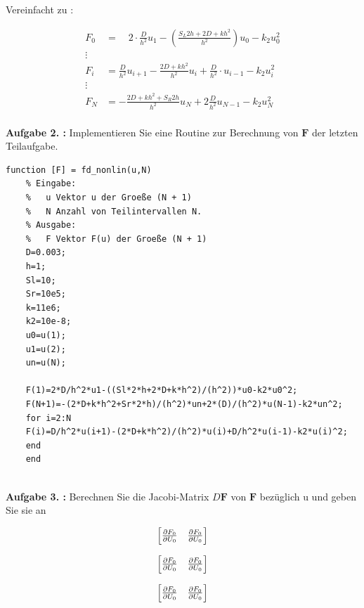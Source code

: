 \begin{qed}
	Vereinfacht zu :
	
	\begin{align*}
		F_0&= \quad 2\cdot \frac{D}{h^2}u_1-\left( \frac{S_L2h+2D+kh^2}{h^2}\right) u_0 -k_2u_0^2\\
		\vdots \\
		F_i&= 	\frac{D}{h^2}u_{i+1}-\frac{2D+kh^2}{h^2}u_i+\frac{D}{h^2}\cdot u_{i-1} -k_2u_i^2\\
		\vdots \\
		F_N &= -\frac{2D+kh^2+S_R2h}{h^2}u_N+2\frac{D}{h^2}u_{N-1}-k_2u^2_N\\
	\end{align*}
\end{qed}

\begin{mybox}
	\textbf{Aufgabe 2. :} Implementieren Sie eine Routine zur Berechnung von $\mathbf{F}$ der letzten Teilaufgabe.\cite{Prof.Dr.AndreasZeiser.April2021}
\end{mybox}

\begin{lstlisting}[style=Matlab-editor]
	function [F] = fd_nonlin(u,N)
	% Eingabe:
	%   u Vektor u der Groeße (N + 1)
	%   N Anzahl von Teilintervallen N.
	% Ausgabe:
	%   F Vektor F(u) der Groeße (N + 1) 
	D=0.003;
	h=1;
	Sl=10;
	Sr=10e5;
	k=11e6;
	k2=10e-8;
	u0=u(1);
	u1=u(2);
	un=u(N);
	
	F(1)=2*D/h^2*u1-((Sl*2*h+2*D+k*h^2)/(h^2))*u0-k2*u0^2;
	F(N+1)=-(2*D+k*h^2+Sr*2*h)/(h^2)*un+2*(D)/(h^2)*u(N-1)-k2*un^2;
	for i=2:N
	F(i)=D/h^2*u(i+1)-(2*D+k*h^2)/(h^2)*u(i)+D/h^2*u(i-1)-k2*u(i)^2;
	end
	end
	
\end{lstlisting}

\begin{mybox}
	\textbf{Aufgabe 3. :} Berechnen Sie die Jacobi-Matrix $D\mathbf{F}$ von $\mathbf{F}$ bezüglich u und geben Sie sie an
\end{mybox}
\begin{equation}
	\begin{bmatrix}
		\pdv{F_0}{U_0} & \pdv{F_0}{U_0}  \\
		
	\end{bmatrix}
\end{equation}

\begin{equation}
	\begin{bmatrix}
		\pdv{F_0}{U_0} & \pdv{F_0}{U_0}  \\
		
	\end{bmatrix}
\end{equation}

\begin{equation}
	\begin{bmatrix}
		\pdv{F_0}{U_0} & \pdv{F_0}{U_0}  \\
		
	\end{bmatrix}
\end{equation}



